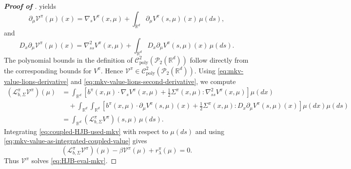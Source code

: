 \documentclass[a4paper, 10pt, english, reqno]{amsart}
\begin{document}
\begin{proof}[\textbf{Proof of }]
\cite[Section 5.6]{carmona2018probabilistic1} yields
\begin{equation}
\label{eq:mkv-value-lions-derivative}
  \partial_\mu\mathcal V^\pi(\mu)(x)
  =
  \nabla_sV^\pi(x,\mu)
  +
  \int_{\mathbb R^d}
  \partial_\mu V^\pi(s,\mu)(x)\,\mu(ds),
\end{equation}
and
\begin{equation}
\label{eq:mkv-value-lions-second-derivative}
  D_x\partial_\mu\mathcal V^\pi(\mu)(x)
  =
  \nabla^2_{ss}V^\pi(x,\mu)
  +
  \int_{\mathbb R^d}
  D_x\partial_\mu V^\pi(s,\mu)(x)\,\mu(ds).
\end{equation}
The polynomial bounds in the definition of
$\mathcal C^2_{\mathrm{poly}}(\mathcal P_2(\mathbb R^d))$ follow
directly from the corresponding bounds for $V^\pi$. Hence
$\mathcal V^\pi\in
\mathcal C^2_{\mathrm{poly}}(\mathcal P_2(\mathbb R^d))$. Using \eqref{eq:mkv-value-lions-derivative} and
\eqref{eq:mkv-value-lions-second-derivative}, we compute
\[
\begin{aligned}
  (\mathcal L_{b,\Sigma}^{\pi}\mathcal V^\pi)(\mu)
  &=
  \int_{\mathbb R^d}
  \left[
    b^\pi(x,\mu)\cdot\nabla_sV^\pi(x,\mu)
    +
    \frac12\Sigma^\pi(x,\mu):\nabla^2_{ss}V^\pi(x,\mu)
  \right]\mu(dx)                                            \\
  &\quad+
  \int_{\mathbb R^d}\int_{\mathbb R^d}
  \left[
    b^\pi(x,\mu)\cdot\partial_\mu V^\pi(s,\mu)(x)
    +
    \frac12\Sigma^\pi(x,\mu):
    D_x\partial_\mu V^\pi(s,\mu)(x)
  \right]\mu(dx)\mu(ds)                                     \\
  &=
  \int_{\mathbb R^d}
  (\mathscr L_{b,\Sigma}^{\pi}V^\pi)(s,\mu)\,\mu(ds).
\end{aligned}
\]
Integrating \eqref{eq:coupled-HJB-used-mkv} with respect to $\mu(ds)$
and using \eqref{eq:mkv-value-as-integrated-coupled-value} gives
\[
  (\mathcal L_{b,\Sigma}^{\pi}\mathcal V^\pi)(\mu)
  -
  \beta\mathcal V^\pi(\mu)
  +
  r_\lambda^\pi(\mu)
  =
  0.
\]
Thus $\mathcal V^\pi$ solves \eqref{eq:HJB-eval-mkv}.


\end{proof}
\end{document}
